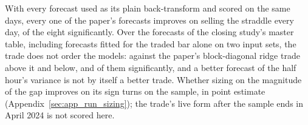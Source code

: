 With every forecast used as its plain back-transform and scored on the same
\cmNdays{} days, every one of the paper's forecasts improves on selling the
straddle every day, \cmPaperVsShortAboveSigN{} of the eight significantly. Over the %
\cmMasterN{} forecasts of the closing study's master table, including forecasts fitted
for the traded bar alone on two input sets, the trade does not order the models: against
the paper's
block-diagonal ridge \cmMasterVsRefAbove{} trade above it and \cmMasterVsRefBelow{} below, %
\cmMasterVsRefAboveSig{} and \cmMasterVsRefBelowSig{} of them significantly, and a better
forecast of the half hour's variance is not by itself a better trade. Whether sizing on
the magnitude of the gap improves on its sign turns on the sample, in point estimate
(Appendix~\ref{sec:app_run_sizing}); the trade's live form after the sample ends in
April 2024 is not scored here.

